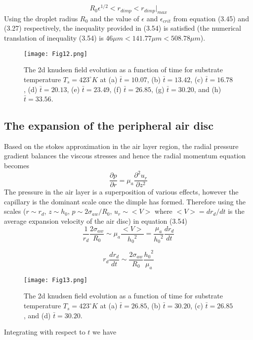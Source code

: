 \documentclass{jfm}
\begin{document}
\begin{equation}
    R_0{\epsilon}^{1/2} < r_{dimp} < r_{dimp}|_{max}
\end{equation}
Using the droplet radius $R_0$ and the value of ${\epsilon}$ and ${\epsilon}_{crit}$ from equation (3.45) and (3.27) respectively, the inequality provided in (3.54) is satisfied (the numerical translation of inequality (3.54) is $46{\mu}m<141.77{\mu}m<508.78{\mu}m$).
\begin{figure*}
    \centering
    \texttt{[image: Fig12.png]}
    \caption{
    The 2d knudsen field evolution as a function of time for substrate temperature ${T}_s=423^{\circ}K$ at (a) $\bar{t}=10.07$, (b) $\bar{t}=13.42$, (c) $\bar{t}=16.78$, (d) $\bar{t}=20.13$, (e) $\bar{t}=23.49$, (f) $\bar{t}=26.85$, (g) $\bar{t}=30.20$, and (h) $\bar{t}=33.56$.
    }
    \label{Figure12}
\end{figure*}

\subsection{The expansion of the peripheral air disc}
Based on the stokes approximation in the air layer region, the radial pressure gradient balances the viscous stresses and hence the radial momentum equation becomes
\begin{equation}
    \frac{{\partial}{p}}{{\partial}{r}}={\mu}_a\frac{{\partial}^2{u}_r}{{\partial}z^2}
\end{equation}
The pressure in the air layer is a superposition of various effects, however the capillary is the dominant scale once the dimple has formed. Therefore using the scales ($r{\sim}r_d$, $z{\sim}h_0$, 
$p{\sim}2{\sigma}_{aw}/R_0$, $u_r{\sim}<V>$ where $<V>=dr_d/dt$ is the average expansion velocity of the air disc) in equation (3.54)
\begin{equation}
    \frac{1}{r_d}\frac{2{\sigma}_{aw}}{R_0}{\sim}{\mu}_a\frac{<V>}{{h_0}^2}=\frac{{\mu}_a}{{h_0}^2}\frac{dr_d}{dt}
\end{equation}

\begin{equation}
    r_d\frac{dr_d}{dt}{\sim}\frac{2{\sigma}_{aw}}{R_0}\frac{{h_0}^2}{{\mu}_a}
\end{equation}
\begin{figure*}
    \centering
    \texttt{[image: Fig13.png]}
    \caption{
    The 2d knudsen field evolution as a function of time for substrate temperature ${T}_s=423^{\circ}K$ at (a) $\bar{t}=26.85$, (b) $\bar{t}=30.20$, (c) $\bar{t}=26.85$, and (d) $\bar{t}=30.20$.
    }
    \label{Figure13}
\end{figure*}
Integrating with respect to $t$ we have
\end{document}
